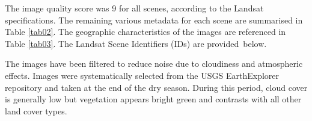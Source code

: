 \documentclass[jimaging,article,accept,pdftex,moreauthors]{Definitions/mdpi}
\begin{document}
The{ image quality score was 9 }%
for all scenes, according to the Landsat specifications. The remaining various metadata for each scene are summarised in Table \ref{tab02}. The geographic characteristics of the images are referenced in Table \ref{tab03}. {The Landsat Scene Identifiers (IDs) are \mbox{provided below.} %
}



 The images have been filtered to reduce noise due to cloudiness and atmospheric effects. Images were systematically selected from the USGS EarthExplorer repository and taken at the end of the dry season. During this period, cloud cover is generally low but vegetation appears bright green and contrasts with all other land cover types. 
\end{document}
